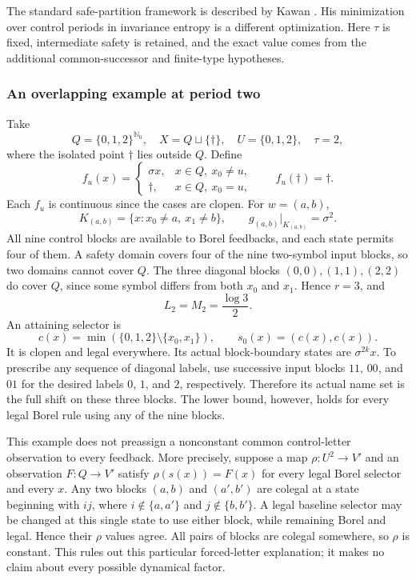 \documentclass[11pt,reqno]{amsart}
\numberwithin{equation}{section}
\theoremstyle{definition}
\newcommand{\Nzero}{\mathbb N_0}
\begin{document}
The standard safe-partition framework is described by Kawan
\cite[Chapter~2]{Kawan2013}. His minimization over control periods in
invariance entropy is a different optimization. Here $\tau$ is fixed,
intermediate safety is retained, and the exact value comes from the
additional common-successor and finite-type hypotheses.

\subsubsection{An overlapping example at period two}

Take
\[
 Q=\{0,1,2\}^{\Nzero},\quad X=Q\sqcup\{\dagger\},\quad
 U=\{0,1,2\},\quad\tau=2,
\]
where the isolated point $\dagger$ lies outside $Q$. Define
\[
 f_u(x)=
 \begin{cases}\sigma x,&x\in Q,\ x_0\ne u,\\
 \dagger,&x\in Q,\ x_0=u,\end{cases}
 \qquad f_u(\dagger)=\dagger.
\]
Each $f_u$ is continuous since the cases are clopen. For $w=(a,b)$,
\[
 K_{(a,b)}=\{x:x_0\ne a,\ x_1\ne b\},\qquad
 g_{(a,b)}|_{K_{(a,b)}}=\sigma^2.
\]
All nine control blocks are available to Borel feedbacks, and each
state permits four of them. A safety domain covers four of the nine
two-symbol input blocks, so two domains cannot cover $Q$. The three
diagonal blocks $(0,0),(1,1),(2,2)$ do cover $Q$, since some symbol
differs from both $x_0$ and $x_1$. Hence $r=3$, and
\[
 L_2=M_2=\frac{\log3}{2}.
\]
An attaining selector is
\[
 c(x)=\min(\{0,1,2\}\setminus\{x_0,x_1\}),\qquad
 s_0(x)=(c(x),c(x)).
\]
It is clopen and legal everywhere. Its actual block-boundary states
are $\sigma^{2k}x$. To prescribe any sequence of diagonal labels, use
successive input blocks $11$, $00$, and $01$ for the desired labels
$0$, $1$, and $2$, respectively. Therefore its actual name set is the
full shift on these three blocks. The lower bound, however, holds for
every legal Borel rule using any of the nine blocks.

This example does not preassign a nonconstant common control-letter
observation to every feedback. More precisely, suppose a map
$\rho:U^2\to V'$ and an observation $F:Q\to V'$ satisfy
$\rho(s(x))=F(x)$ for every legal Borel selector and every $x$.
Any two blocks $(a,b)$ and $(a',b')$ are colegal at a state beginning
with $ij$, where $i\notin\{a,a'\}$ and $j\notin\{b,b'\}$.
A legal baseline selector may be changed at this single state to use
either block, while remaining Borel and legal. Hence their $\rho$
values agree. All pairs of blocks are colegal somewhere, so $\rho$
is constant. This rules out this particular forced-letter explanation;
it makes no claim about every possible dynamical factor.
\end{document}
